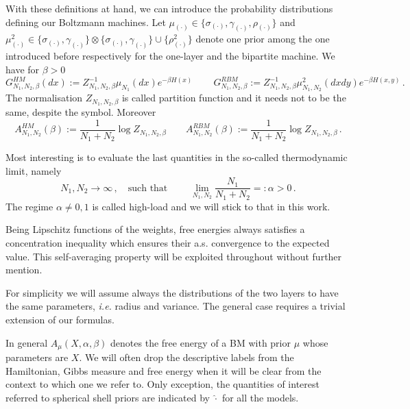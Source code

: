 \documentclass[10pt,oneside,a4paper,reqno]{amsart}  %
\def\be{\begin{equation}}
\def\ee{\end{equation}}
\def\ie{\textit{i.e. }}
\def\a{\alpha}
\def\e{\varepsilon}
\def\g{\gamma}
\def\b{\beta}
\def\r{\rho}
\def\s{\sigma}
\theoremstyle{plain}
\numberwithin{equation}{section}
\begin{document}
With these definitions at hand, we can introduce the probability distributions defining our Boltzmann machines. Let $\mu_{(\cdot)}\in\{\s_{(\cdot)},\g_{(\cdot)},\r_{(\cdot)}\}$ and $\mu^2_{(\cdot)}\in\{\s_{(\cdot)},\g_{(\cdot)}\}\otimes \{\s_{(\cdot)},\g_{(\cdot)}\}\cup\{\r_{(\cdot)}^2\}$ denote one prior among the one introduced before respectively for the one-layer and the bipartite machine. We have for $\b>0$
\be\label{eq:Gibbs}
G^{HM}_{N_1,N_2,\b}(dx):=Z_{N_1,N_2,\b}^{-1}\mu_{N_1}(dx)e^{-\b H(x)}\,\qquad G^{RBM}_{N_1,N_2,\b}:=Z_{N_1,N_2,\b}^{-1}\mu^2_{N_1,N_2}(dxdy)e^{-\b H(x,y)}\,.
\ee
The normalisation $Z_{N_1,N_2,\b}$ is called partition function and it needs not to be the same, despite the symbol. Moreover
\be\label{eq:free}
A^{HM}_{N_1,N_2}(\b):=\frac{1}{N_1+N_2}\log Z_{N_1,N_2,\b}\qquad A^{RBM}_{N_1,N_2}(\b):=\frac{1}{N_1+N_2}\log Z_{N_1,N_2,\b}\,. 
\ee

Most interesting is to evaluate the last quantities in the so-called thermodynamic limit, namely
$$
N_1,N_2\to\infty\,,\quad\mbox{such that }\qquad \lim_{N_1,N_2}\frac{N_1}{N_1+N_2}=:\a>0\,.
$$ 
The regime $\a\neq0,1$ is called high-load and we will stick to that in this work. 

Being Lipschitz functions of the weights, free energies always satisfies a concentration inequality which ensures their a.s. convergence to the expected value. This self-averaging property will be exploited throughout without further mention. 

For simplicity we will assume always the distributions of the two layers to have the same parameters, \ie radius and variance. The general case requires a trivial extension of our formulas. 

In general $A_\mu(X,\a,\b)$ denotes the free energy of a BM with prior $\mu$ whose parameters are $X$. We will often drop the descriptive labels from the Hamiltonian, Gibbs measure and free energy when it will be clear from the context to which one we refer to. Only exception, the quantities of interest referred to spherical shell priors are indicated by $\widehat \cdot$ for all the models. 
\end{document}
